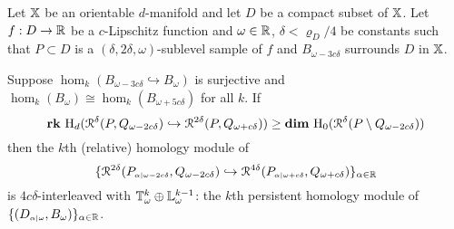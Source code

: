 \begin{theorem}\label{thm:main}
  Let $\mathbb{X}$ be an orientable $d$-manifold and let $D$ be a compact subset of $\mathbb{X}$.
  Let $f : D\to\mathbb{R}$ be a $c$-Lipschitz function and $\omega\in\mathbb{R}$, $\delta < \varrho_D/4$ be constants such that $P\subset D$ is a $(\delta, 2\delta,\omega)$-sublevel sample of $f$ and $B_{\omega-3c\delta}$ surrounds $D$ in $\mathbb{X}$.

  Suppose $\hom_k(B_{\omega-3c\delta}\hookrightarrow B_\omega)$ is surjective and $\hom_k(B_\omega)\cong\hom_k(B_{\omega+5c\delta})$ for all $k$.
  If
    \[\mathbf{rk}~\mathrm{H}_d(\mathcal{R}^\delta(P, Q_{\omega - 2c\delta})\hookrightarrow \mathcal{R}^{2\delta}(P, Q_{\omega+c\delta})) \geq \mathbf{dim}~\mathrm{H}_0(\mathcal{R}^\delta(P\setminus Q_{\omega-2c\delta}))\]
  then the $k$th (relative) homology module of
  \[\{\mathcal{R}^{2\delta}(P_{\scriptscriptstyle \alpha\mid \omega-2c\delta}, Q_{\omega-2c\delta})\hookrightarrow \mathcal{R}^{4\delta}(P_{\scriptscriptstyle \alpha\mid \omega+c\delta}, Q_{\omega+c\delta})\}_{\alpha\in\mathbb{R}}\]
  is $4c\delta$-interleaved with $\mathbb{T}_{\omega}^k \oplus \mathbb{L}_\omega^{k-1}$: the $k$th persistent homology module of $\{(D_{\scriptscriptstyle \alpha\mid \omega}, B_\omega)\}_{\alpha\in\mathbb{R}}$.
\end{theorem}
